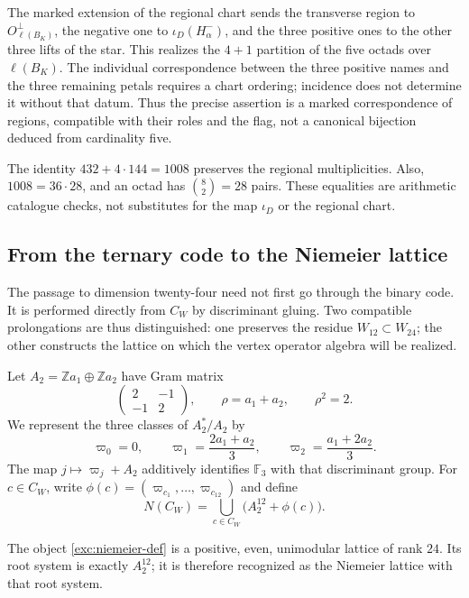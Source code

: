 The marked extension of the regional chart sends the transverse region
to $O_{\ell(B_K)}^\perp$, the negative one to $\iota_D(H^-_\alpha)$, and the
three positive ones to the other three lifts of the star. This
realizes the $4+1$ partition of the five octads over $\ell(B_K)$.
The individual correspondence between the three positive names and
the three remaining petals requires a chart ordering; incidence
does not determine it without that datum. Thus the precise assertion is a
marked correspondence of regions, compatible with their roles and the
flag, not a canonical bijection deduced from cardinality five.

The identity $432+4\cdot144=1008$ preserves the regional
multiplicities. Also, $1008=36\cdot28$, and an octad has
$\binom82=28$ pairs. These equalities are arithmetic catalogue
checks, not substitutes for the map $\iota_D$ or the regional chart.



\subsection{From the ternary code to the Niemeier lattice}
\label{exc:niemeier}

The passage to dimension twenty-four need not first go through the
binary code. It is performed directly from $C_W$ by discriminant
gluing. Two compatible prolongations are thus distinguished:
one preserves the residue $W_{12}\subset W_{24}$; the other constructs the
lattice on which the vertex operator algebra will be realized.

Let $A_2=\mathbb Z a_1\oplus\mathbb Z a_2$ have Gram matrix
\[
 \begin{pmatrix}2&-1\\-1&2\end{pmatrix},
 \qquad \rho=a_1+a_2,\qquad \rho^2=2.
\]
We represent the three classes of $A_2^*/A_2$ by
\[
 \varpi_0=0,\qquad
 \varpi_1=\frac{2a_1+a_2}{3},\qquad
 \varpi_2=\frac{a_1+2a_2}{3}.
\]
The map $j\mapsto\varpi_j+A_2$ additively identifies
$\mathbb F_3$ with that discriminant group. For $c\in C_W$, write
$\phi(c)=(\varpi_{c_1},\ldots,\varpi_{c_{12}})$ and define
\begin{equation}
 N(C_W)=\bigcup_{c\in C_W}\bigl(A_2^{12}+\phi(c)\bigr).
 \label{exc:niemeier-def}
\end{equation}

\begin{theorem}
\label{exc:niemeier-teorema}
The object \eqref{exc:niemeier-def} is a positive, even,
unimodular lattice of rank $24$. Its root system is exactly
$A_2^{12}$; it is therefore recognized as the Niemeier lattice with
that root system.
\end{theorem}

